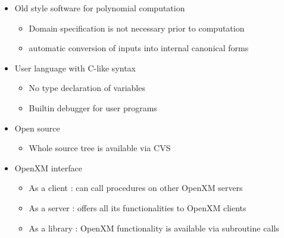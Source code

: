 \setlength{\parskip}{10pt}

\begin{slide}{}

\begin{itemize}
\item Old style software for polynomial computation

\begin{itemize}
\item Domain specification is not necessary prior to computation
\item automatic conversion of inputs into internal canonical forms
\end{itemize}

\item User language with C-like syntax

\begin{itemize}
\item No type declaration of variables
\item Builtin debugger for user programs
\end{itemize}

\item Open source

\begin{itemize}
\item Whole source tree is available via CVS
\end{itemize}

\item OpenXM interface

\begin{itemize}
\item As a client : can call procedures on other OpenXM servers
\item As a server : offers all its functionalities to OpenXM clients
\item As a library : OpenXM functionality is available via subroutine calls
\end{itemize}
\end{itemize}
\end{slide}

